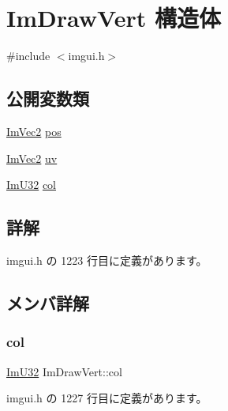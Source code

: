 \hypertarget{struct_im_draw_vert}{}\section{Im\+Draw\+Vert 構造体}
\label{struct_im_draw_vert}


{\ttfamily \#include $<$imgui.\+h$>$}

\subsection*{公開変数類}
\begin{DoxyCompactItemize}
\item 
\mbox{\hyperlink{struct_im_vec2}{Im\+Vec2}} \mbox{\hyperlink{struct_im_draw_vert_aedc578bbf364ddea71be12b4f177a5b4}{pos}}
\item 
\mbox{\hyperlink{struct_im_vec2}{Im\+Vec2}} \mbox{\hyperlink{struct_im_draw_vert_abdf3183529055a6c3f709b23a4bf06b1}{uv}}
\item 
\mbox{\hyperlink{imgui_8h_a118cff4eeb8d00e7d07ce3d6460eed36}{Im\+U32}} \mbox{\hyperlink{struct_im_draw_vert_ab98ba53ce2690b56f5ba94682ed83940}{col}}
\end{DoxyCompactItemize}


\subsection{詳解}


 imgui.\+h の 1223 行目に定義があります。



\subsection{メンバ詳解}
\mbox{\label{struct_im_draw_vert_ab98ba53ce2690b56f5ba94682ed83940}} 
\subsubsection{\texorpdfstring{col}{col}}
{\footnotesize\ttfamily \mbox{\hyperlink{imgui_8h_a118cff4eeb8d00e7d07ce3d6460eed36}{Im\+U32}} Im\+Draw\+Vert\+::col}



 imgui.\+h の 1227 行目に定義があります。

\mbox{\label{struct_im_draw_vert_aedc578bbf364ddea71be12b4f177a5b4}} 
